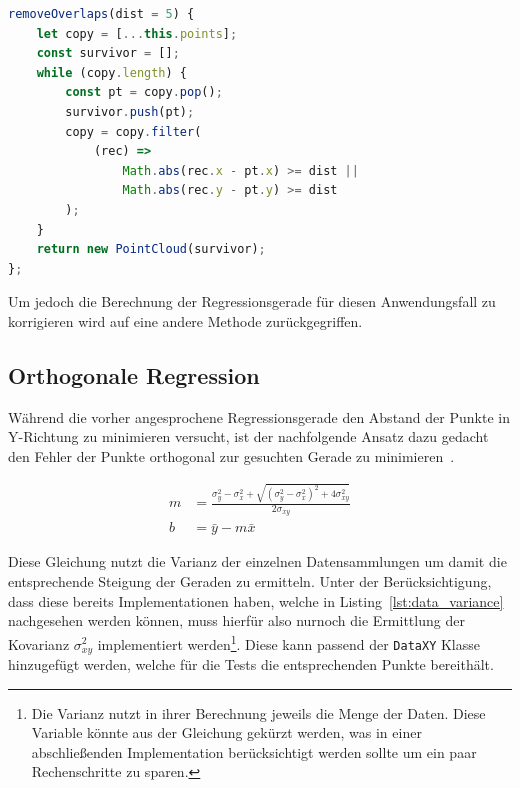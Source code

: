 \begin{lstlisting}[language=JavaScript, caption={Definition der \lstinline{removeOverlaps} Funktion der \lstinline{PointCloud} Klasse.}, label={lst:pointcloud_removeOverlaps}]
removeOverlaps(dist = 5) {
    let copy = [...this.points];
    const survivor = [];
    while (copy.length) {
        const pt = copy.pop();
        survivor.push(pt);
        copy = copy.filter(
            (rec) =>
                Math.abs(rec.x - pt.x) >= dist ||
                Math.abs(rec.y - pt.y) >= dist
        );
    }
    return new PointCloud(survivor);
};
\end{lstlisting}

Um jedoch die Berechnung der Regressionsgerade für diesen Anwendungsfall zu korrigieren wird auf eine andere Methode zurückgegriffen.

\subsection{Orthogonale Regression}\label{ch:orthogonale_regression}

Während die vorher angesprochene Regressionsgerade den Abstand der Punkte in Y-Richtung zu minimieren versucht, ist der nachfolgende Ansatz dazu gedacht den Fehler der Punkte orthogonal zur gesuchten Gerade zu minimieren~\cite[S.~140]{JuergenHedderich2020}.

\begin{equation}
    \begin{split}
        m &= \frac{\sigma_y^2 - \sigma_x^2 + \sqrt{(\sigma_y^2 - \sigma_x^2)^2 + 4\sigma_{xy}^2}}{2\sigma_{xy}} \\
        b &= \bar{y} - m \bar{x}
    \end{split}
    \label{eq:orthogonal_regression}
\end{equation}

Diese Gleichung nutzt die Varianz der einzelnen Datensammlungen um damit die entsprechende Steigung der Geraden zu ermitteln.
Unter der Berücksichtigung, dass diese bereits Implementationen haben, welche in Listing~\ref{lst:data_variance} nachgesehen werden können, muss hierfür also nurnoch die Ermittlung der Kovarianz $\sigma_{xy}^2$ implementiert werden\footnote{Die Varianz nutzt in ihrer Berechnung jeweils die Menge der Daten. Diese Variable könnte aus der Gleichung gekürzt werden, was in einer abschlie{\ss}enden Implementation berücksichtigt werden sollte um ein paar Rechenschritte zu sparen.}.
Diese kann passend der \lstinline{DataXY} Klasse hinzugefügt werden, welche für die Tests die entsprechenden Punkte bereithält.


